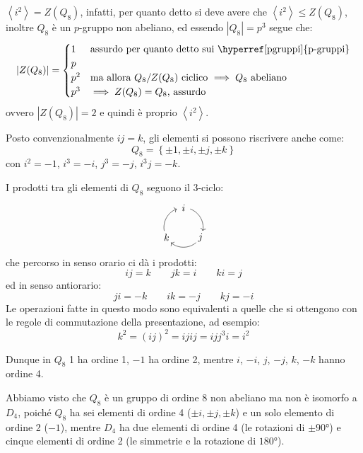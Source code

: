\documentclass[11pt]{scrartcl}
\begin{document}
\begin{remark}
    $\left<i^2\right> = Z(Q_8)$, infatti, per quanto detto si deve avere che $\left<i^2\right> \leqslant  Z(Q_8)$, inoltre $Q_8$ è un $p$-gruppo non abeliano, ed
    essendo $|Q_8| = p^3$ segue che:
        \[ |Z(Q_8)| = \begin{cases}
                        1 & \text{assurdo per quanto detto sui \hyperref[pgruppi]{p-gruppi}} \\
                        p \\
                        p^2 & \text{ma allora $Q_8/Z(Q_8)$ ciclico $\implies Q_8$ abeliano} \\
                        p^3 & \text{$\implies Z(Q_8) = Q_8$, assurdo}
                    \end{cases}
        \]
      ovvero $|Z(Q_8)|=2$ e quindi è proprio $\left<i^2\right>$.
\end{remark}

Posto convenzionalmente $ij = k$, gli elementi si possono riscrivere anche come:
    \[ Q_8 = \left\{\pm 1, \pm i, \pm j, \pm k\right\}
        \]
con $i^2 = -1$, $i^3 = -i$, $j^3 = -j$, $i^3j = -k$.

\begin{remark}
    [Prodotto in $Q_8$]
    I prodotti tra gli elementi di $Q_8$ seguono il $3$-ciclo:
    \[  \begin{tikzpicture}[->,scale=.7] 
        \foreach \a/\t in {90/i,-30/j,210/k}{
          \node (\t) at (\a:1cm) {$\t$};
          \draw (\a-20:1cm)  arc (\a-20:\a-100:1cm);
        } 
        \end{tikzpicture}
    \]
    che percorso in senso orario ci dà i prodotti:
    \[ ij = k \qquad jk = i \qquad ki = j
        \]
    ed in senso antiorario:
    \[ ji = -k \qquad ik = -j \qquad kj = -i
        \]
    Le operazioni fatte in questo modo sono equivalenti a quelle che si ottengono con le regole di commutazione della presentazione, ad esempio:
        \[ k^2 = (ij)^2 = i j i j = ijj^3i = i^2 
            \]
\end{remark}

\begin{remark}
    Dunque in $Q_8$ 1 ha ordine 1, $-1$ ha ordine 2, mentre $i$, $-i$, $j$, $-j$, $k$, $-k$ hanno ordine 4.   
\end{remark}

Abbiamo visto che $Q_8$ è un gruppo di ordine $8$ non abeliano ma non è isomorfo a $D_4$,
poiché $Q_8$ ha sei elementi di ordine 4 ($\pm i, \pm j, \pm k$) e un solo elemento di ordine 2 ($-1$), 
mentre $D_4$ ha due elementi di ordine 4 (le rotazioni di $\pm 90°$) e cinque elementi di ordine 2 (le simmetrie e la rotazione di $180°$). \\
\end{document}
